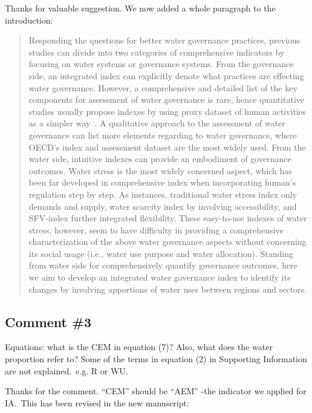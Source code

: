\AR{} Thanks for valuable suggestion. We now added a whole paragraph to the introduction:  %

\begin{quote}
    Responding the questions for better water governance practices, previous studies can divide into two categories of comprehensive indicators by focusing on water systems or governance systems.
    From the governance side, an integrated index can explicitly denote what practices are effecting water governance.
    However, a comprehensive and detailed list of the key components for assessment of water governance is rare, hence quantitative studies usually propose indexes by using proxy dataset of human activities as a simpler way~\cite{varis2019}.
    A qualitative approach to the assessment of water governance can list more elements regarding to water governance, where OECD's index and assessment dataset are the most widely used. %
    From the water side, intuitive indexes can provide an embodiment of governance outcomes.
    Water stress is the most widely concerned aspect, which has been far developed in comprehensive index when incorporating human's regulation step by step.
    As instances, traditional water stress index only demands and supply, water scarcity index by involving accessibility, and SFV-index further integrated flexibility.
    These easy-to-use indexes of water stress, however, seem to have difficulty in providing a comprehensive characterization of the above water governance aspects without concerning its social usage (i.e., water use purpose and water allocation).
    Standing from water side for comprehensively quantify governance outcomes, here we aim to develop an integrated water governance index to identify its changes by involving apportions of water uses between regions and sectors.
\end{quote}

\subsection{Comment \#3}
\RC{} Equations: what is the CEM in equation (7)? Also, what does the water proportion refer to? Some of the terms in equation (2) in Supporting Information are not explained.\ e.g. R or WU.\

\AR{} Thanks for the comment. ``CEM'' should be ``AEM'' -the indicator we applied for IA.\ This has been revised in the new manuscript:

